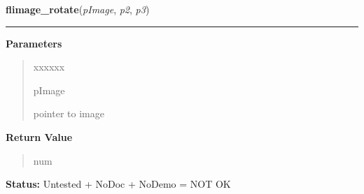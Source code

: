 \hspace{.8\funcindent}\begin{boxedminipage}{\funcwidth}

    \raggedright \textbf{flimage\_rotate}(\textit{pImage}, \textit{p2}, \textit{p3})

    \vspace{-1.5ex}

    \rule{\textwidth}{0.5\fboxrule}
\setlength{\parskip}{2ex}
\setlength{\parskip}{1ex}
      \textbf{Parameters}
      \vspace{-1ex}

      \begin{quote}
        \begin{Ventry}{xxxxxx}

          \item[pImage]

          pointer to image

        \end{Ventry}

      \end{quote}

      \textbf{Return Value}
    \vspace{-1ex}

      \begin{quote}
      num

      \end{quote}

\textbf{Status:} Untested + NoDoc + NoDemo = NOT OK



    \end{boxedminipage}

    \label{xformslib:library:flimage_flip}

    \vspace{0.5ex}

